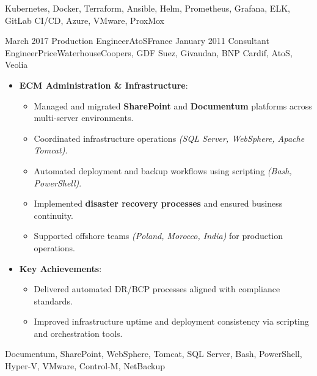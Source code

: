 \begin{experiences}
{\begin{itemize}[left=0pt,label={},itemsep=0.5em]
        \end{itemize}
    }
    \vspace{0.5em}  %
    {Kubernetes, Docker, Terraform, Ansible, Helm, Prometheus, Grafana, ELK, GitLab CI/CD, Azure, VMware, ProxMox}

\emptySeparator
\emptySeparator

\consultantexperience
    {March 2017}       {Production Engineer}{AtoS}{France}
    {January 2011}    {Consultant Engineer}{PriceWaterhouseCoopers, GDF Suez, Givaudan, BNP Cardif, AtoS, Veolia} {
        \begin{itemize}[left=0pt,label={},itemsep=0.4em]


          \item \textbf{ECM Administration \& Infrastructure}:
            \begin{itemize}[itemsep=0.15em,topsep=0.1em,parsep=0pt]
              \small
              \item Managed and migrated \textbf{SharePoint} and \textbf{Documentum} platforms across multi-server environments.
              \item Coordinated infrastructure operations \emph{(SQL Server, WebSphere, Apache Tomcat)}.
              \item Automated deployment and backup workflows using scripting \emph{(Bash, PowerShell)}.
              \item Implemented \textbf{disaster recovery processes} and ensured business continuity.
              \item Supported offshore teams \emph{(Poland, Morocco, India)} for production operations.
            \end{itemize}

          \item \textbf{Key Achievements}:
            \begin{itemize}[itemsep=0.2em,topsep=0.2em,parsep=0pt]
              \small
              \item Delivered automated DR/BCP processes aligned with compliance standards.
              \item Improved infrastructure uptime and deployment consistency via scripting and orchestration tools.
            \end{itemize}
        \end{itemize}
    }
    {Documentum, SharePoint, WebSphere, Tomcat, SQL Server, Bash, PowerShell, Hyper-V, VMware, Control-M, NetBackup}


\end{experiences}
